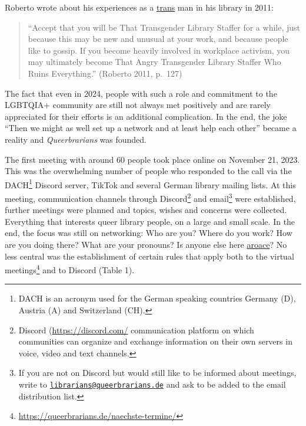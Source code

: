 \documentclass[a4paper,
fontsize=11pt,
oneside,
numbers=noperiodatend,
parskip=half-,
bibliography=totoc,
final
]{scrartcl}
\begin{document}
Roberto wrote about his experiences as a
\href{https://lgbtqia.fandom.com/wiki/Transgender}{trans} man in his
library in 2011:

\begin{quote}
\enquote{Accept that you will be That Transgender Library Staffer for a while,
just because this may be new and unusual at your work, and because
people like to gossip. If you become heavily involved in workplace
activism, you may ultimately become That Angry Transgender Library
Staffer Who Ruins Everything.} (Roberto 2011, p.~127)
\end{quote}

The fact that even in 2024, people with such a role and commitment to
the LGBTQIA+ community are still not always met positively and are
rarely appreciated for their efforts is an additional complication. In
the end, the joke \enquote{Then we might as well set up a network and at least
help each other} became a reality and \emph{Queerbrarians} was founded.

The first meeting with around 60 people took place online on November
21, 2023. This was the overwhelming number of people who responded to
the call via the DACH\footnote{DACH is an acronym used for the German
  speaking countries Germany (D), Austria (A) and Switzerland (CH).}
Discord server, TikTok and several German library mailing lists. At this
meeting, communication channels through Discord\footnote{Discord
  (\url{https://discord.com/} communication platform on which
  communities can organize and exchange information on their own servers
  in voice, video and text channels.} and email\footnote{If you are not
  on Discord but would still like to be informed about meetings, write
  to
  \href{mailto:librarians@queerbrarians.de}{\nolinkurl{librarians@queerbrarians.de}}
  and ask to be added to the email distribution list.} were established,
further meetings were planned and topics, wishes and concerns were
collected. Everything that interests queer library people, on a large
and small scale. In the end, the focus was still on networking: Who are
you? Where do you work? How are you doing there? What are your pronouns?
Is anyone else here
\href{https://lgbtqia.mywikis.wiki/wiki/Aroace}{aroace}? No less central
was the establishment of certain rules that apply both to the virtual
meetings\footnote{\url{https://queerbrarians.de/naechste-termine/}} and
to Discord (Table 1).
\end{document}

